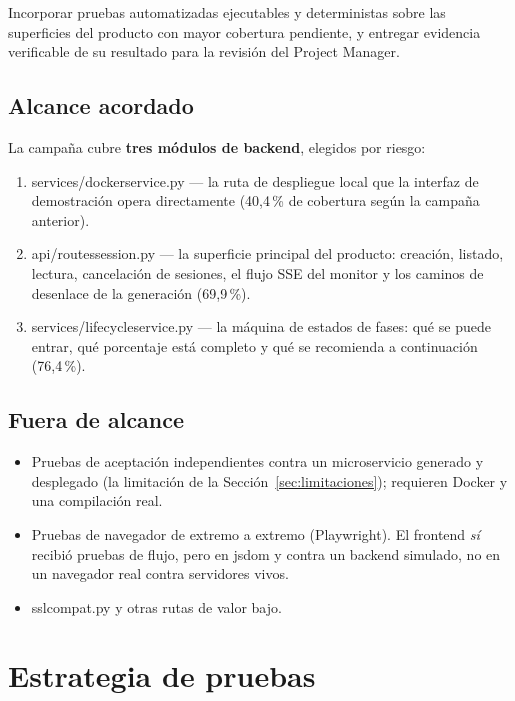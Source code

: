 \documentclass[11pt,a4paper]{article}
\newcommand{\code}[1]{{\ttfamily\small\def\_{\textunderscore\allowbreak}#1}}
\begin{document}
Incorporar pruebas automatizadas ejecutables y deterministas sobre las superficies del
producto con mayor cobertura pendiente, y entregar evidencia verificable de su resultado
para la revisión del Project Manager.

\subsection{Alcance acordado}

La campaña cubre \textbf{tres módulos de backend}, elegidos por riesgo:

\begin{enumerate}[leftmargin=1.6em]
\item \code{services/docker\_service.py} --- la ruta de despliegue local que la interfaz de
      demostración opera directamente (40{,}4\,\% de cobertura según la campaña anterior).
\item \code{api/routes\_session.py} --- la superficie principal del producto: creación,
      listado, lectura, cancelación de sesiones, el flujo SSE del monitor y los caminos de
      desenlace de la generación (69{,}9\,\%).
\item \code{services/lifecycle\_service.py} --- la máquina de estados de fases: qué se puede
      entrar, qué porcentaje está completo y qué se recomienda a continuación (76{,}4\,\%).
\end{enumerate}

\subsection{Fuera de alcance}

\begin{itemize}[leftmargin=1.4em]
\item Pruebas de aceptación independientes contra un microservicio generado y desplegado
      (la limitación de la Sección~\ref{sec:limitaciones}); requieren Docker y una
      compilación real.
\item Pruebas de navegador de extremo a extremo (Playwright). El frontend \emph{sí} recibió
      pruebas de flujo, pero en jsdom y contra un backend simulado, no en un navegador real
      contra servidores vivos.
\item \code{ssl\_compat.py} y otras rutas de valor bajo.
\end{itemize}

\section{Estrategia de pruebas}
\end{document}
